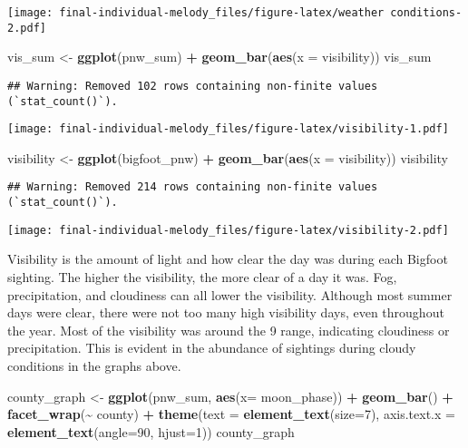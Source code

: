 \documentclass[
]{article}
\newenvironment{Shaded}{\begin{snugshade}}{\end{snugshade}}
\newcommand{\AttributeTok}[1]{\textcolor[rgb]{0.13,0.29,0.53}{#1}}
\newcommand{\DecValTok}[1]{\textcolor[rgb]{0.00,0.00,0.81}{#1}}
\newcommand{\FunctionTok}[1]{\textcolor[rgb]{0.13,0.29,0.53}{\textbf{#1}}}
\newcommand{\NormalTok}[1]{#1}
\newcommand{\OtherTok}[1]{\textcolor[rgb]{0.56,0.35,0.01}{#1}}
\newcommand{\SpecialCharTok}[1]{\textcolor[rgb]{0.81,0.36,0.00}{\textbf{#1}}}
\begin{document}
\texttt{[image: final-individual-melody\_files/figure-latex/weather conditions-2.pdf]}

\begin{Shaded}
\begin{Highlighting}[]
\NormalTok{vis\_sum }\OtherTok{\textless{}{-}} \FunctionTok{ggplot}\NormalTok{(pnw\_sum) }\SpecialCharTok{+} \FunctionTok{geom\_bar}\NormalTok{(}\FunctionTok{aes}\NormalTok{(}\AttributeTok{x =}\NormalTok{ visibility))}
\NormalTok{vis\_sum}
\end{Highlighting}
\end{Shaded}

\begin{verbatim}
## Warning: Removed 102 rows containing non-finite values (`stat_count()`).
\end{verbatim}

\texttt{[image: final-individual-melody\_files/figure-latex/visibility-1.pdf]}

\begin{Shaded}
\begin{Highlighting}[]
\NormalTok{visibility }\OtherTok{\textless{}{-}} \FunctionTok{ggplot}\NormalTok{(bigfoot\_pnw) }\SpecialCharTok{+} \FunctionTok{geom\_bar}\NormalTok{(}\FunctionTok{aes}\NormalTok{(}\AttributeTok{x =}\NormalTok{ visibility))}
\NormalTok{visibility}
\end{Highlighting}
\end{Shaded}

\begin{verbatim}
## Warning: Removed 214 rows containing non-finite values (`stat_count()`).
\end{verbatim}

\texttt{[image: final-individual-melody\_files/figure-latex/visibility-2.pdf]}

Visibility is the amount of light and how clear the day was during each
Bigfoot sighting. The higher the visibility, the more clear of a day it
was. Fog, precipitation, and cloudiness can all lower the visibility.
Although most summer days were clear, there were not too many high
visibility days, even throughout the year. Most of the visibility was
around the 9 range, indicating cloudiness or precipitation. This is
evident in the abundance of sightings during cloudy conditions in the
graphs above.

\begin{Shaded}
\begin{Highlighting}[]
\NormalTok{county\_graph }\OtherTok{\textless{}{-}} \FunctionTok{ggplot}\NormalTok{(pnw\_sum, }\FunctionTok{aes}\NormalTok{(}\AttributeTok{x=}\NormalTok{ moon\_phase)) }\SpecialCharTok{+} \FunctionTok{geom\_bar}\NormalTok{() }\SpecialCharTok{+} \FunctionTok{facet\_wrap}\NormalTok{(}\SpecialCharTok{\textasciitilde{}}\NormalTok{ county) }\SpecialCharTok{+}
    \FunctionTok{theme}\NormalTok{(}\AttributeTok{text =} \FunctionTok{element\_text}\NormalTok{(}\AttributeTok{size=}\DecValTok{7}\NormalTok{),}
        \AttributeTok{axis.text.x =} \FunctionTok{element\_text}\NormalTok{(}\AttributeTok{angle=}\DecValTok{90}\NormalTok{, }\AttributeTok{hjust=}\DecValTok{1}\NormalTok{)) }
\NormalTok{county\_graph}
\end{Highlighting}
\end{Shaded}
\end{document}
